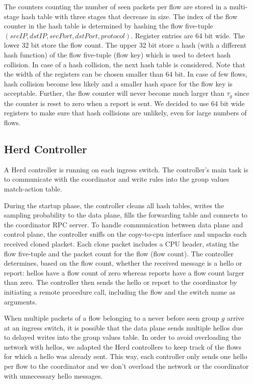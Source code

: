 \documentclass[11pt,oneside,a4paper]{article}
\begin{document}
The counters counting the number of seen packets per flow are stored in a multi-stage hash table with three stages that decrease in size. The index of the flow counter in the hash table is determined by hashing the flow five-tuple $(srcIP, dstIP, srcPort, dstPort, protocol)$. Register entries are 64 bit wide. The lower 32 bit store the flow count. The upper 32 bit store a hash (with a different hash function) of the flow five-tuple (flow key) which is used to detect hash collision. In case of a hash collision, the next hash table is considered. Note that the width of the registers can be chosen smaller than 64 bit. In case of few flows, hash collision become less likely and a smaller hash space for the flow key is acceptable. Further, the flow counter will never become much larger than $\tau_g$ since the counter is reset to zero when a report is sent. We decided to use 64 bit wide registers to make sure that hash collisions are unlikely, even for large numbers of flows.

\subsection{Herd Controller} \label{controller}

A Herd controller is running on each ingress switch. The controller's main task is to communicate with the coordinator and write rules into the group values match-action table.

\noindent During the startup phase, the controller cleans all hash tables, writes the sampling probability to the data plane, fills the forwarding table and connects to the coordinator RPC server. To handle communication between data plane and control plane, the controller sniffs on the copy-to-cpu interface and unpacks each received cloned placket. Each clone packet includes a CPU header, stating the flow five-tuple and the packet count for the flow (flow count). The controller determines, based on the flow count, whether the received message is a hello or report: hellos have a flow count of zero whereas reports have a flow count larger than zero. The controller then sends the hello or report to the coordinator by initiating a remote procedure call, including the flow and the switch name as arguments.

\noindent When multiple packets of a flow belonging to a never before seen group $g$ arrive at an ingress switch, it is possible that the data plane sends multiple hellos due to delayed writes into the group values table. In order to avoid overloading the network with hellos, we adapted the Herd controllers to keep track of the flows for which a hello was already sent. This way, each controller only sends one hello per flow to the coordinator and we don't overload the network or the coordinator with unnecessary hello messages.
\end{document}

